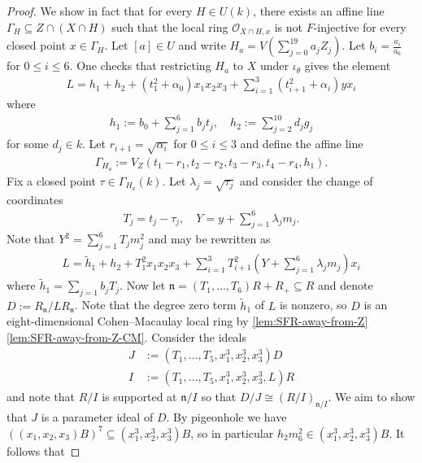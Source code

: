 \documentclass[reqno,11pt]{amsart}
\makeatletter
\numberwithin{equation}{section}
\theoremstyle{definition}
\theoremstyle{definition}
\theoremstyle{definition}
\theoremstyle{remark}
\newcommand{\fn}{\mathfrak{n}}
\newcommand{\cO}{\mathcal{O}}
\renewcommand*{\eqref}[1]{%
  \hyperref[{#1}]{\textup{\tagform@{\ref*{#1}}}}%
}
\makeatother
\begin{document}
\begin{proof}
    We show in fact that for every $H\in U(k)$, there exists an affine line $\Gamma_H\subseteq Z\cap (X\cap H)$ such that the local ring $\cO_{X\cap H,x}$ is not $F$-injective for every closed point $x\in \Gamma_H$. Let $[a]\in U$ and write $H_a=V\left(\sum\limits_{j=0}^{19} a_j Z_j\right)$. Let $b_i=\frac{a_i}{a_6}$ for $0\leq i\leq 6$. One checks that restricting $H_a$ to $X$ under $\iota_\theta$ gives the element
    \begin{align}
        L=h_1+h_2+(t_1^2+\alpha_0)x_1x_2x_3+\sum\limits_{i=1}^3 (t_{i+1}^2+\alpha_i)yx_i\label{eq:Line-not-F-injective}
    \end{align}
    where
    \begin{align*}
        h_1:=b_0+\sum\limits_{j=1}^6 b_j t_j,\quad h_2:=\sum\limits_{j=2}^{10}d_j g_j
    \end{align*}
    for some $d_j\in k$. Let $r_{i+1}=\sqrt{\alpha_i}$ for $0\leq i\leq 3$ and define the affine line
    \begin{align*}
        \Gamma_{H_a}:=V_Z(t_1-r_1,t_2-r_2,t_3-r_3,t_4-r_4,h_1).
    \end{align*}
Fix a closed point $\tau\in \Gamma_{H_a}(k)$. Let $\lambda_j=\sqrt{\tau_j}$ and consider the change of coordinates
\begin{align*}
    T_j=t_j-\tau_j,\quad Y=y+\sum\limits_{j=1}^6\lambda_j m_j.
\end{align*}
Note that $Y^2=\sum\limits_{j=1}^6 T_j m_j^2$ and \eqref{eq:Line-not-F-injective} may be rewritten as
\begin{align}
L=\widetilde{h}_1+h_2+T_1^2x_1x_2x_3+\sum\limits_{i=1}^3 T_{i+1}^2\left(Y+\sum\limits_{j=1}^6 \lambda_j m_j\right)x_i\label{eq:translated-L}
\end{align}
where $\widetilde{h}_1=\sum\limits_{j=1}b_j T_j$. Now let $\fn=(T_1,\ldots, T_6)R+R_+\subseteq R$ and denote $D:=R_\fn/LR_\fn$. Note that the degree zero term $\widetilde{h}_1$ of $L$ is nonzero, so $D$ is an eight-dimensional Cohen--Macaulay local ring by \cref{lem:SFR-away-from-Z}\ref{lem:SFR-away-from-Z-CM}. Consider the ideals
\begin{align*}
    J&:=(T_1,\dots, T_5,x_1^3,x_2^3,x_3^3)D\\
    I&:=(T_1,\dots, T_5,x_1^3,x_2^3,x_3^3,L)R
\end{align*}
and note that $R/I$ is supported at $\fn/I$ so that $D/J\cong (R/I)_{\fn/I}$. We aim to show that $J$ is a parameter ideal of $D$. By pigeonhole we have $((x_1,x_2,x_3)B)^7\subseteq (x_1^3,x_2^3,x_3^3)B$, so in particular $h_2 m_6^2\in (x_1^3,x_2^3,x_3^3)B$. It follows that

\end{proof}
\end{document}
